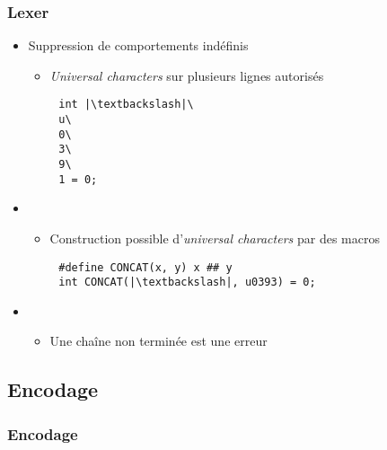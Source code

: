 \documentclass[C++.tex]{subfiles}
\begin{document}
\begin{frame}[fragile]
	\frametitle{Lexer}
	\begin{itemize}
		\item Suppression de comportements indéfinis
		\begin{itemize}
			\item \textit{Universal characters} sur plusieurs lignes autorisés
		\end{itemize}
	\end{itemize}
	
	\begin{verbatim}
		int |\textbackslash|\
		u\
		0\
		3\
		9\
		1 = 0;
	\end{verbatim}

	\begin{itemize}
		\item [] \begin{itemize}
			\item Construction possible d'\textit{universal characters} par des macros
		\end{itemize}
	\end{itemize}

	\begin{verbatim}
		#define CONCAT(x, y) x ## y
		int CONCAT(|\textbackslash|, u0393) = 0;
	\end{verbatim}

	\begin{itemize}
		\item [] \begin{itemize}
			\item Une chaîne non terminée est une erreur
		\end{itemize}
	\end{itemize}
\end{frame}

\subsection*{Encodage}
\begin{frame}[fragile]
	\frametitle{Encodage}
\end{frame}
\end{document}

